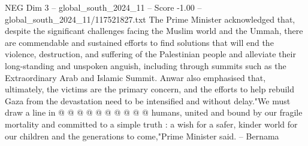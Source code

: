 \begin{textsample}{NEG Dim 3 – global\_south\_2024\_11 – Score -1.00 – global\_south\_2024\_11/117521827.txt}
The Prime Minister acknowledged that, despite the significant challenges facing the Muslim world and the Ummah, there are commendable and sustained efforts to find solutions that will end the violence, destruction, and suffering of the Palestinian people and alleviate their long-standing and unspoken anguish, including through summits such as the Extraordinary Arab and Islamic Summit.
Anwar also emphasised that, ultimately, the victims are the primary concern, and the efforts to help rebuild Gaza from the devastation need to be intensified and without delay."We must draw a line in @ @ @ @ @ @ @ @ @ @ humans, united and bound by our fragile mortality and committed to a simple truth : a wish for a safer, kinder world for our children and the generations to come,"Prime Minister said. -- Bernama

\end{textsample}

